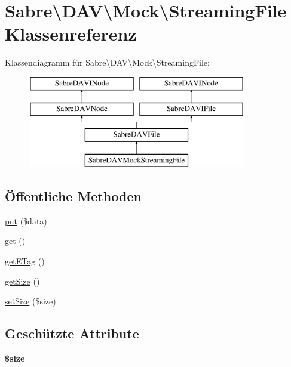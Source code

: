 \hypertarget{class_sabre_1_1_d_a_v_1_1_mock_1_1_streaming_file}{}\section{Sabre\textbackslash{}D\+AV\textbackslash{}Mock\textbackslash{}Streaming\+File Klassenreferenz}
\label{class_sabre_1_1_d_a_v_1_1_mock_1_1_streaming_file}
Klassendiagramm für Sabre\textbackslash{}D\+AV\textbackslash{}Mock\textbackslash{}Streaming\+File\+:\begin{figure}[H]
\begin{center}
\leavevmode
\includegraphics[height=4.000000cm]{class_sabre_1_1_d_a_v_1_1_mock_1_1_streaming_file}
\end{center}
\end{figure}
\subsection*{Öffentliche Methoden}
\begin{DoxyCompactItemize}
\item 
\mbox{\hyperlink{class_sabre_1_1_d_a_v_1_1_mock_1_1_streaming_file_a78ce92fdea212d201f097698c0c5a1a8}{put}} (\$data)
\item 
\mbox{\hyperlink{class_sabre_1_1_d_a_v_1_1_mock_1_1_streaming_file_a4492beb835030b97e2bc3e6c4d2cdf4d}{get}} ()
\item 
\mbox{\hyperlink{class_sabre_1_1_d_a_v_1_1_mock_1_1_streaming_file_a53ac81dd1c660afac1dd3c39c00e4d47}{get\+E\+Tag}} ()
\item 
\mbox{\hyperlink{class_sabre_1_1_d_a_v_1_1_mock_1_1_streaming_file_a693c21cb705844f3d3defd4484976520}{get\+Size}} ()
\item 
\mbox{\hyperlink{class_sabre_1_1_d_a_v_1_1_mock_1_1_streaming_file_a706476699b3eed39ee2fa533891155fe}{set\+Size}} (\$size)
\end{DoxyCompactItemize}
\subsection*{Geschützte Attribute}
\begin{DoxyCompactItemize}
\item 
\mbox{\label{class_sabre_1_1_d_a_v_1_1_mock_1_1_streaming_file_a3e1b7d706e316f2dd8941506c958e607}} 
{\bfseries \$size}
\end{DoxyCompactItemize}


